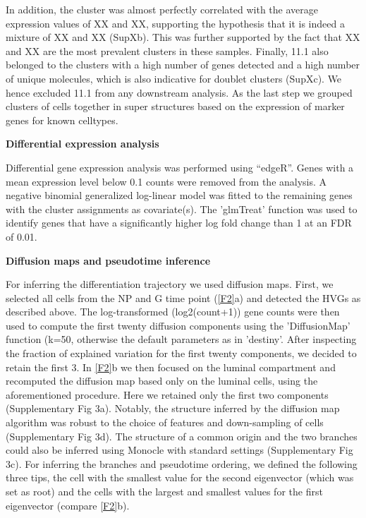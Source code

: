 \documentclass[titlepage, 12pt, oneside]{amsart}
\begin{document}
In addition, the cluster was almost perfectly correlated with the average expression values of XX and XX, supporting the hypothesis that it is indeed a mixture of XX and XX (SupXb).
This was further supported by the fact that XX and XX are the most prevalent clusters in these samples.
Finally, 11.1 also belonged to the clusters with a high number of genes detected and a high number of unique molecules, which is also indicative for doublet clusters (SupXc).
We hence excluded 11.1 from any downstream analysis.
As the last step we grouped clusters of cells together in super structures based on the expression of marker genes for known celltypes.

\textbf{Differential expression analysis }

Differential gene expression analysis was performed using ``edgeR''\autocite{Robinson2010}.
Genes with a mean expression level below 0.1 counts were removed from the analysis.
A negative binomial generalized log-linear model was fitted to the remaining genes with the cluster assignments as covariate(s).
The 'glmTreat' function was used to identify genes that have a significantly higher log fold change than 1 at an FDR of 0.01.

\textbf{Diffusion maps and pseudotime inference}

For inferring the differentiation trajectory we used diffusion maps.
First, we selected all cells from the NP and G time point (\autoref{F2}a) and detected the HVGs as described above.
The log-transformed (log2(count+1)) gene counts were then used to compute the first twenty diffusion components using the 'DiffusionMap' function (k=50, otherwise the default parameters as in 'destiny'\autocite{Angerer2016}.
After inspecting the fraction of explained variation for the first twenty components, we decided to retain the first 3.
In \autoref{F2}b we then focused on the luminal compartment and recomputed the diffusion map based only on the luminal cells, using the aforementioned procedure.
Here we retained only the first two components (Supplementary Fig 3a).
Notably, the structure inferred by the diffusion map algorithm was robust to the choice of features and down-sampling of cells (Supplementary Fig 3d).
The structure of a common origin and the two branches could also be inferred using Monocle with standard settings\autocite{Trapnell2014} (Supplementary Fig 3c).
For inferring the branches and pseudotime ordering, we defined the following three tips, the cell with the smallest value for the second eigenvector (which was set as root) and the cells with the largest and smallest values for the first eigenvector (compare \autoref{F2}b).  
\end{document}
